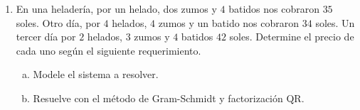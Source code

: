 \documentclass[
  spanish,
  8pt,
  utf8,
  xcolor=table,
  handout,
  aspectratio=169,
  professionalfonts,
  notheorems,
  mathserif,
]{beamer}
\newcounter{savedenum}
\newcommand*{\saveenum}{\setcounter{savedenum}{\theenumi}}
\begin{document}
\begin{frame}
\begin{enumerate}
\begin{multicols}{2}
\begin{enumerate}[a)]
				            Modele el sistema a resolver.

				      \item

				            Resuelve con el método de Gram-Schmidt y
				            factorización QR.
			      \end{enumerate}
		      \end{multicols}

		\item

		      En una heladería, por un helado, dos zumos y $4$ batidos
		      nos cobraron $35$ soles.
		      Otro día, por $4$ helados, $4$ zumos y un batido nos
		      cobraron $34$ soles.
		      Un tercer día por $2$ helados, $3$ zumos y $4$ batidos $42$
		      soles.
		      Determine el precio de cada uno según el siguiente
		      requerimiento.

		      \begin{multicols}{2}
			      \begin{enumerate}[a)]
				      \item

				            Modele el sistema a resolver.

				      \item

				            Resuelve con el método de Gram-Schmidt y
				            factorización QR.
			      \end{enumerate}
		      \end{multicols}
		      \saveenum
	\end{enumerate}
\end{frame}
\end{document}
